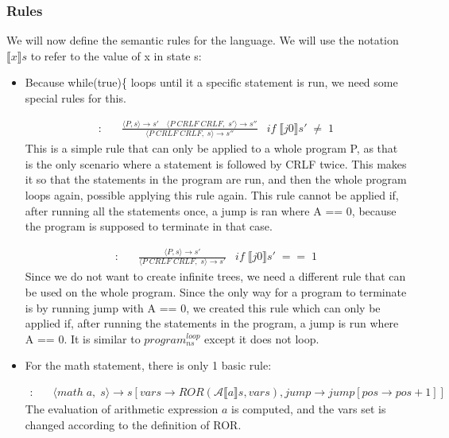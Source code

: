 \documentclass{article}
\begin{document}
\subsubsection{Rules}
We will now define the semantic rules for the language. We will use the notation $\llbracket x \rrbracket s$ to refer to the value of x in state s:
\begin{itemize}
\item Because while(true)\{ loops until it a specific statement is run, we need some special rules for this.

\begin{align*}
    [program^{loop}_{ns}]: & \quad\frac
    {\langle P, s \rangle \rightarrow s' 
    \quad
    \langle P\; CRLF\; CRLF,\; s' \rangle \rightarrow s''}
    {\langle P\; CRLF\; CRLF,\; s\rangle \rightarrow s''}
    & if\; \llbracket j0\rrbracket s'\; \neq \; 1
\end{align*}
This is a simple rule that can only be applied to a whole program P, as that is the only scenario where a statement is followed by CRLF twice. This makes it so that the statements in the program are run, and then the whole program loops again, possible applying this rule again. This rule cannot be applied if, after running all the statements once, a jump is ran where A == 0, because the program is supposed to terminate in that case.

\begin{align*}
    [program^{jump0}_{ns}]: & \quad\frac
    {\langle P, s \rangle \rightarrow s' }
    {\langle P\; CRLF\; CRLF,\; s\rangle \rightarrow s'}
    & if\; \llbracket j0\rrbracket s'\; ==\; 1
\end{align*}
Since we do not want to create infinite trees, we need a different rule that can be used on the whole program. Since the only way for a program to terminate is by running jump with A == 0, we created this rule which can only be applied if, after running the statements in the program, a jump is run where A == 0. It is similar to $program^{loop}_{ns}$ except it does not loop.



\item For the math statement, there is only 1 basic rule:

\begin{align*}
    [math A_{ns}]: & \quad
    \langle math\; a,\; s \rangle \rightarrow s[vars \rightarrow ROR(\mathscr{A}\llbracket a\rrbracket s, vars), jump \rightarrow jump[pos \rightarrow pos+1]]
\end{align*}
The evaluation of arithmetic expression $a$ is computed, and the vars set is changed according to the definition of ROR.


\end{itemize}
\end{document}
